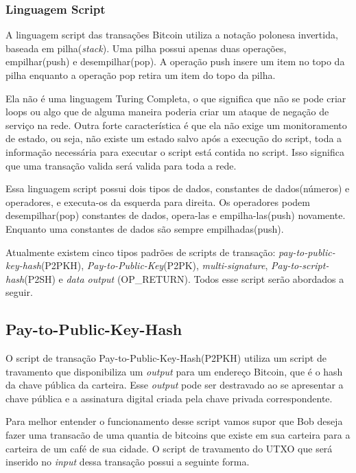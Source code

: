 \documentclass[conference,compsoc]{IEEEtran}
\begin{document}
\subsubsection{Linguagem Script}  

A linguagem script das transações Bitcoin utiliza a notação polonesa invertida, baseada em pilha(\textit{stack}). Uma pilha possui apenas duas operações, empilhar(push) e desempilhar(pop). A operação push insere um item no topo da pilha enquanto a operação pop retira um item do topo da pilha.

Ela não é uma linguagem Turing Completa, o que significa que não se pode criar loops ou algo que de alguma maneira poderia criar um ataque de negação de serviço na rede. Outra forte característica é que ela não exige um monitoramento de estado, ou seja, não existe um estado salvo após a execução do script, toda a informação necessária para executar o script está contida no script. Isso significa que uma transação valida será valida para toda a rede.

Essa linguagem script possui dois tipos de dados, constantes de dados(números) e operadores, e executa-os da esquerda para direita. Os operadores podem desempilhar(pop) constantes de dados, opera-las e empilha-las(push) novamente. Enquanto uma constantes de dados são sempre empilhadas(push).

Atualmente existem cinco tipos padrões de scripts de transação: \textit{pay-to-public-key-hash}(P2PKH), \textit{Pay-to-Public-Key}(P2PK), \textit{multi-signature}, \textit{Pay-to-script-hash}(P2SH) e \textit{data output} (OP\_RETURN). Todos esse script serão abordados a seguir.

\subsection*{Pay-to-Public-Key-Hash}
O script de transação Pay-to-Public-Key-Hash(P2PKH) utiliza um script de travamento que disponibiliza um \textit{output} para um endereço Bitcoin, que é o hash da chave pública da carteira. Esse \textit{output} pode ser destravado ao se apresentar a chave pública e a assinatura digital criada pela chave privada correspondente.

Para melhor entender o funcionamento desse script vamos supor que Bob deseja fazer uma transacão de uma quantia de bitcoins que existe em sua carteira para a carteira de um café de sua cidade. O script de travamento do UTXO que será inserido no \textit{input} dessa transação possui a seguinte forma.
\end{document}
